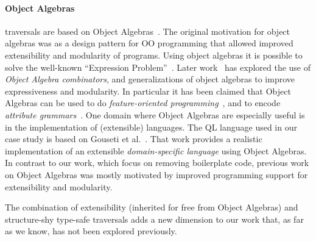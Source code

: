 \paragraph{Object Algebras} \name traversals are based on
Object Algebras~\cite{bruno12oa}. The original motivation for object
algebras was as a design pattern for OO programming that allowed
improved extensibility and modularity of programs.  Using object
algebras it is possible to solve the well-known ``Expression
Problem''~\cite{wadler98expression-problem}.  Later
work~\cite{oliveira13fop,rendel14attributes} has explored the use of
\emph{Object Algebra combinators}, and generalizations of object
algebras to improve expressiveness and modularity. In particular it
has been claimed that Object Algebras can be used to do
\emph{feature-oriented programming}~\cite{oliveira13fop}, and to
encode \emph{attribute grammars}~\cite{rendel14attributes}. One domain
where Object Algebras are especially useful is in the implementation
of (extensible) languages.  The QL language used in our case study is
based on Gouseti et al.~\cite{gouseti14extensible}. That work
provides a realistic implementation of an extensible
\emph{domain-specific language} using Object Algebras. In contrast to
our work, which focus on removing boilerplate code, previous work on Object Algebras was mostly motivated by
improved programming support for extensibility and modularity.
\begin{comment}
Our
work shows that Object Algebras are also useful to solve a different
problem: how to traverse complex structures without boilerplate
code.
\end{comment}
The combination of extensibility (inherited for free from Object
Algebras) and structure-shy type-safe traversals  adds a new
dimension to our work that, as far as we know, has not been explored
previously.

